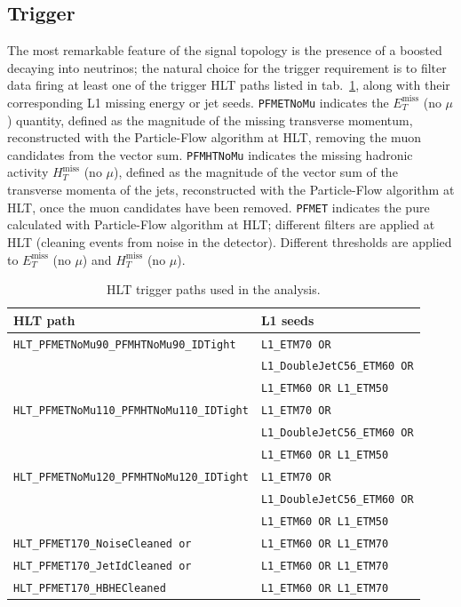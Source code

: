 \subsection{Trigger}
\label{ssec:trigger}
The most remarkable feature of the signal topology is the presence of a boosted \Z decaying into neutrinos; the natural choice for the trigger requirement is to filter data firing at least one of the \met trigger HLT paths listed in tab.~\ref{tab:trig_default}, along with their corresponding L1 missing energy or jet seeds. {\tt PFMETNoMu} indicates the $E_T^{\text{miss}}$ (no $\mu$) quantity, defined as the magnitude of the missing transverse momentum, reconstructed with the Particle-Flow algorithm at HLT, removing the muon candidates from the vector sum. {\tt PFMHTNoMu} indicates the missing hadronic activity $H_T^{\text{miss}}$ (no $\mu$), defined as the magnitude of the vector sum of the transverse momenta of the jets, reconstructed with the Particle-Flow algorithm at HLT, once the muon candidates have been removed. {\tt PFMET} indicates the pure \MET calculated with Particle-Flow algorithm at HLT; different filters are applied at HLT (cleaning events from noise in the detector). Different thresholds are applied to $E_T^{\text{miss}}$ (no $\mu$) and $H_T^{\text{miss}}$ (no $\mu$).

\begin{table}[!htb]
\centering
  \caption{HLT trigger paths used in the analysis.\label{tab:trig_default}}
 \begin{tabular}{l|l} 
 HLT path & L1 seeds\\
 \hline
 \hline
 \texttt{HLT\_PFMETNoMu90\_PFMHTNoMu90\_IDTight} & \texttt{L1\_ETM70 OR} \\
& \texttt{L1\_DoubleJetC56\_ETM60 OR}\\
&  \texttt{L1\_ETM60 OR L1\_ETM50}\\
 \hline
 \texttt{HLT\_PFMETNoMu110\_PFMHTNoMu110\_IDTight} & \texttt{L1\_ETM70 OR} \\
& \texttt{L1\_DoubleJetC56\_ETM60 OR}\\
&  \texttt{L1\_ETM60 OR L1\_ETM50}\\
 \hline
 \texttt{HLT\_PFMETNoMu120\_PFMHTNoMu120\_IDTight} & \texttt{L1\_ETM70 OR} \\
& \texttt{L1\_DoubleJetC56\_ETM60 OR}\\
&  \texttt{L1\_ETM60 OR L1\_ETM50}\\
\hline
 \texttt{HLT\_PFMET170\_NoiseCleaned or} & \texttt{L1\_ETM60 OR L1\_ETM70}\\
\hline
 \texttt{HLT\_PFMET170\_JetIdCleaned or} & \texttt{L1\_ETM60 OR L1\_ETM70}\\
\hline
 \texttt{HLT\_PFMET170\_HBHECleaned} & \texttt{L1\_ETM60 OR L1\_ETM70}\\
 \end{tabular}
\end{table}

